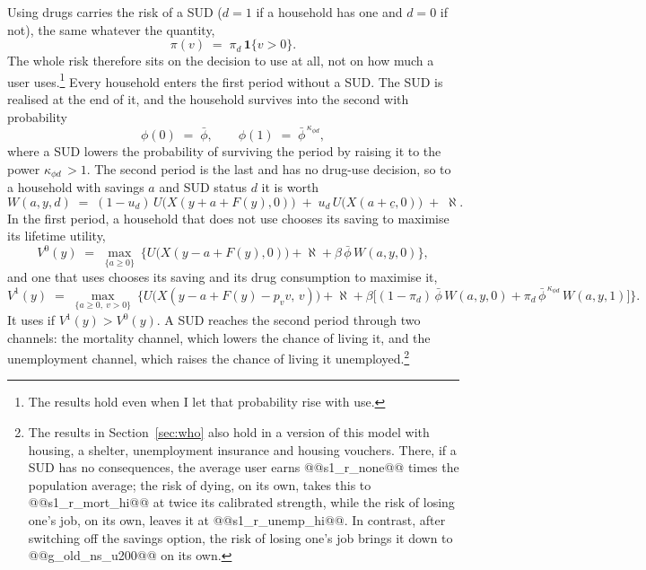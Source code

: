 \documentclass[10pt]{article}
\begin{document}
Using drugs carries the risk of a SUD ($d=1$ if a household has one and $d=0$ if not), the same whatever the quantity,
\begin{equation}\label{eq:hazard}
\pi(v) \;=\; \pi_d\,\mathbf{1}\{v>0\}.
\end{equation}
The whole risk therefore sits on the decision to use
at all, not on how much a user uses.\footnote{The results hold even when I let that probability rise with use.} Every household enters the first period without a SUD. The SUD is realised at the end of it, and the household survives into the second with probability
\begin{equation}\label{eq:surv}
\phi(0) \;=\; \bar\phi, \qquad \phi(1) \;=\; \bar\phi^{\,\kappa_{\phi d}},
\end{equation}
where a SUD lowers the probability of surviving the period by raising it to the power $\kappa_{\phi d}$$\,>1$. The second period is the last and has no drug-use decision, so to a household with savings $a$ and SUD status $d$ it is worth
\begin{equation}\label{eq:w2}
W(a,y,d) \;=\; (1-u_d)\,U\big(X(y+a+F(y),0)\big)\;+\;u_d\,U\big(X(a+\underline c,0)\big)\;+\;\aleph.
\end{equation}
In the first period, a household that does not use chooses its saving to maximise its lifetime utility,
\begin{equation}\label{eq:v0}
V^0(y) \;=\; \max_{\{a\ge0\}}\ \Big\{U\big(X(y-a+F(y),0)\big)+\aleph+\beta\,\bar\phi\,W(a,y,0)\Big\},
\end{equation}
and one that uses chooses its saving and its drug consumption to maximise it,
\begin{equation}\label{eq:v1}
V^1(y) \;=\; \max_{\{a\ge0,\ v>0\}}\ \Big\{U\big(X(y-a+F(y)-p_v v,\,v)\big)+\aleph+\beta\Big[(1-\pi_d)\,\bar\phi\,W(a,y,0)+\pi_d\,\bar\phi^{\,\kappa_{\phi d}}\,W(a,y,1)\Big]\Big\}.
\end{equation}
It uses if $V^1(y)>V^0(y)$. A SUD reaches the second period through two channels: the mortality channel, which lowers the chance of living it, and the unemployment channel, which raises the chance of living it unemployed.\footnote{The results in Section~\ref{sec:who} also hold in a version of this model with housing, a shelter, unemployment insurance and housing vouchers. There, if a SUD has no consequences, the average user earns @@s1_r_none@@ times the population average; the risk of dying, on its own, takes this to @@s1_r_mort_hi@@ at twice its calibrated strength, while the risk of losing one's job, on its own, leaves it at @@s1_r_unemp_hi@@.   In contrast, after switching off the savings option, the risk of losing one's job brings it down to @@g_old_ns_u200@@ on its own.}
\end{document}
